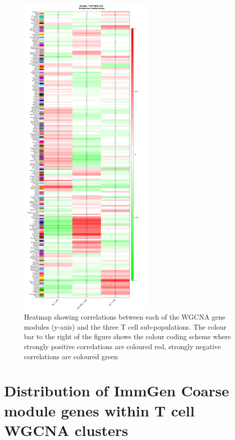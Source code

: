 \begin{figure}[H] 
    \centering
\includegraphics[width=0.58\textwidth]{Figures/Chapter4/WGCNA/tcell_immgen_data_module_trait_relationships_heatmap.png}
\caption{\small{Heatmap showing correlations between each of the WGCNA gene modules (y-axis) and the three T cell sub-populations. The colour bar to the right of the figure shows the colour coding scheme where strongly positive correlations are coloured red, strongly negative correlations are coloured green} }
    \label{fig:15}
\end{figure}

\section{Distribution of ImmGen Coarse module genes within T cell WGCNA clusters}

